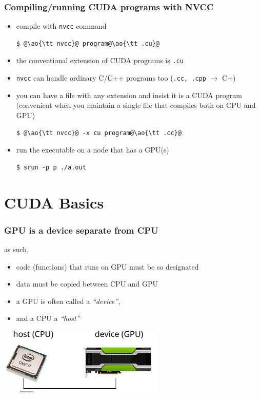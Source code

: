 \documentclass[12pt,dvipdfmx]{beamer}
\newcommand{\ao}[1]{{\color{blue}#1}}
\begin{document}
\begin{frame}[fragile]
\frametitle{Compiling/running CUDA programs with NVCC}

\begin{itemize}
\item compile with {\tt nvcc} command
\begin{lstlisting}
$ @\ao{\tt nvcc}@ program@\ao{\tt .cu}@
\end{lstlisting}
\item the conventional extension of CUDA programs is {\tt .cu}
  
\item {\tt nvcc} can handle ordinary C/C++ programs too
  ({\tt .cc, .cpp} $\rightarrow$ C+)

\item  you can have a file with any extension and insist it is a CUDA program
  (convenient when you maintain
  a single file that compiles both on CPU and GPU)
\begin{lstlisting}
$ @\ao{\tt nvcc}@ -x cu program@\ao{\tt .cc}@
\end{lstlisting}
  
\item run the executable on a node that has a GPU(s)
\begin{lstlisting}
$ srun -p p ./a.out
\end{lstlisting} %

\end{itemize}
\end{frame}

\section{CUDA Basics}

\begin{frame}
  \frametitle{GPU is a device separate from CPU}
  as such,
  \begin{itemize}
  \item code (functions) that runs on GPU must be so designated
  \item data must be copied between CPU and GPU
  \item a GPU is often called a \ao{\it ``device''},
  \item and a CPU a \ao{\it ``host''}
  \end{itemize}

  \begin{center}
\includegraphics[width=0.6\textwidth]{out/pdf/svg/cpu_gpu_1.pdf}
  \end{center}
  
\end{frame}
\end{document}
